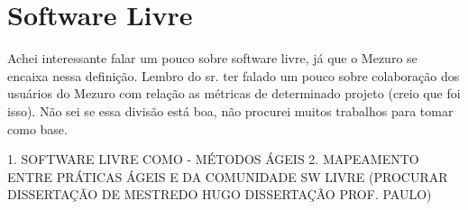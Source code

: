 \chapter{Software Livre}

Achei interessante falar um pouco sobre software livre, já que o Mezuro se encaixa nessa definição. Lembro do sr. ter falado um pouco sobre colaboração dos usuários do Mezuro com relação as métricas de determinado projeto (creio que foi isso).
Não sei se essa divisão está boa, não procurei muitos trabalhos para tomar como base.

1. SOFTWARE LIVRE COMO - MÉTODOS ÁGEIS
2. MAPEAMENTO ENTRE PRÁTICAS ÁGEIS E DA COMUNIDADE SW LIVRE (PROCURAR DISSERTAÇÃO DE MESTREDO HUGO {DISSERTAÇÃO PROF. PAULO})